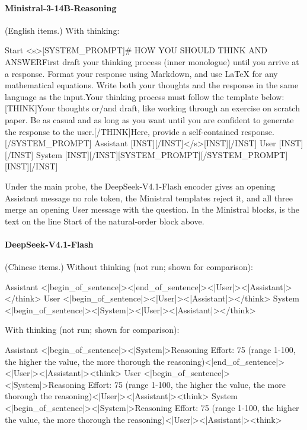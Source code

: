 \paragraph{Ministral-3-14B-Reasoning} (English items.)
\noindent With thinking:
\begin{Rendering}
Start      <s>[SYSTEM_PROMPT]# HOW YOU SHOULD THINK AND ANSWER\NL{}\NL{}First draft your thinking process (inner monologue) until you arrive at a response. Format your response using Markdown, and use LaTeX for any mathematical equations. Write both your thoughts and the response in the same language as the input.\NL{}\NL{}Your thinking process must follow the template below:[THINK]Your thoughts or/and draft, like working through an exercise on scratch paper. Be as casual and as long as you want until you are confident to generate the response to the user.[/THINK]Here, provide a self-contained response.[/SYSTEM_PROMPT]
Assistant  [INST][/INST]</s>[INST][/INST]
User       [INST]\NL{}\NL{}\NL{}\NL{}[/INST]
System     [INST][/INST][SYSTEM_PROMPT][/SYSTEM_PROMPT][INST][/INST]
\end{Rendering}

Under the main probe, the DeepSeek-V4.1-Flash encoder gives an opening Assistant message no role token, the Ministral templates reject it, and all three merge an opening User message with the question. In the Ministral blocks,  is the text on the line Start of the natural-order block above.

\paragraph{DeepSeek-V4.1-Flash} (Chinese items.)
\noindent Without thinking (not run; shown for comparison):
\begin{Rendering}
Assistant  <|begin_of_sentence|><|end_of_sentence|><|User|><|Assistant|></think>
User       <|begin_of_sentence|><|User|>\NL{}\NL{}<|Assistant|></think>
System     <|begin_of_sentence|><|System|><|User|><|Assistant|></think>
\end{Rendering}
\noindent With thinking (not run; shown for comparison):
\begin{Rendering}
Assistant  <|begin_of_sentence|><|System|>Reasoning Effort: 75 (range 1-100, the higher the value, the more thorough the reasoning)\NL{}\NL{}<|end_of_sentence|><|User|><|Assistant|><think>
User       <|begin_of_sentence|><|System|>Reasoning Effort: 75 (range 1-100, the higher the value, the more thorough the reasoning)\NL{}\NL{}<|User|>\NL{}\NL{}<|Assistant|><think>
System     <|begin_of_sentence|><|System|>Reasoning Effort: 75 (range 1-100, the higher the value, the more thorough the reasoning)\NL{}\NL{}<|User|><|Assistant|><think>
\end{Rendering}
